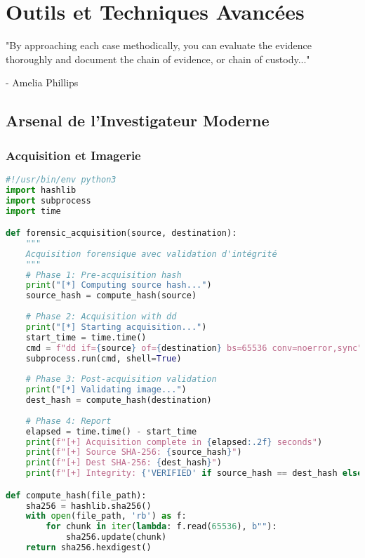 \chapter{Outils et Techniques Avancées}
\epigraph{"By approaching each case methodically, you can evaluate the evidence thoroughly and document the chain of evidence, or chain of custody..."}{- Amelia Phillips}
\section{Arsenal de l'Investigateur Moderne}
\subsection{Acquisition et Imagerie}
\begin{lstlisting}[language=Python, caption=Script d'acquisition avec validation]
#!/usr/bin/env python3
import hashlib
import subprocess
import time

def forensic_acquisition(source, destination):
    """
    Acquisition forensique avec validation d'intégrité
    """
    # Phase 1: Pre-acquisition hash
    print("[*] Computing source hash...")
    source_hash = compute_hash(source)
    
    # Phase 2: Acquisition with dd
    print("[*] Starting acquisition...")
    start_time = time.time()
    cmd = f"dd if={source} of={destination} bs=65536 conv=noerror,sync"
    subprocess.run(cmd, shell=True)
    
    # Phase 3: Post-acquisition validation
    print("[*] Validating image...")
    dest_hash = compute_hash(destination)
    
    # Phase 4: Report
    elapsed = time.time() - start_time
    print(f"[+] Acquisition complete in {elapsed:.2f} seconds")
    print(f"[+] Source SHA-256: {source_hash}")
    print(f"[+] Dest SHA-256: {dest_hash}")
    print(f"[+] Integrity: {'VERIFIED' if source_hash == dest_hash else 'FAILED'}")

def compute_hash(file_path):
    sha256 = hashlib.sha256()
    with open(file_path, 'rb') as f:
        for chunk in iter(lambda: f.read(65536), b""):
            sha256.update(chunk)
    return sha256.hexdigest()
\end{lstlisting}

